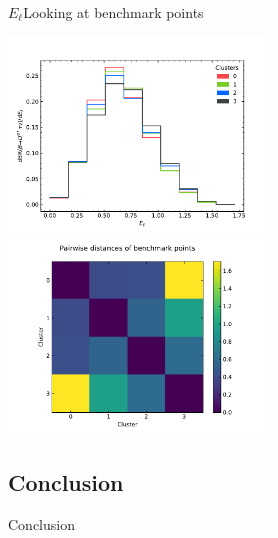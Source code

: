 %
\begin{frame}{$E_\ell$}{Looking at benchmark points}
	\begin{changemargin}{-1cm}{-1cm}
		\begin{center}
			{\includegraphics[height=5.2cm, clip, trim=0cm 0cm 1.2cm 1cm]{figures/from-paper/El_tanbeta_dist3}}
			{\includegraphics[height=5.2cm, clip, trim=2.3cm 0cm 2cm 0cm]{figures/from-paper/El_tanbeta_dist3_bpoint_distances}}
		\end{center}
	\end{changemargin}
\end{frame}
%
\subsection{Conclusion}
\begin{frame}{Conclusion}
	
\end{frame}